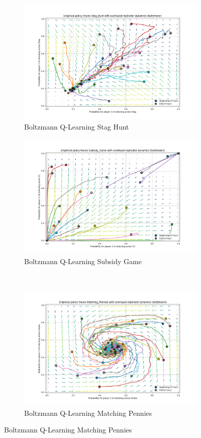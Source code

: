 \documentclass[12pt,letterpaper, onecolumn]{exam}
\begin{document}
\begin{figure}
    \begin{subfigure}{.5\textwidth}
      \centering
      \includegraphics[width=.6\linewidth]{plots/replicator_trajectoreis_Stag_Hunt_boltzmann.png}
      \caption{Boltzmann Q-Learning Stag Hunt}
      \label{fig:sfigbsh}
    \end{subfigure}%
    \begin{subfigure}{.5\textwidth}
      \centering
      \includegraphics[width=.6\linewidth]{plots/replicator_trajectoreis_Subsidy_Game_boltzmann.png}
      \caption{Boltzmann Q-Learning Subsidy Game}
      \label{fig:sfigbsg}
    \end{subfigure}\\
    \begin{subfigure}{.5\textwidth}
      \centering
      \includegraphics[width=.6\linewidth]{plots/replicator_trajectoreis_Matching_Pennies_boltzmann.png}
      \caption{Boltzmann Q-Learning Matching Pennies}

\end{subfigure}
\end{figure}
\end{document}
